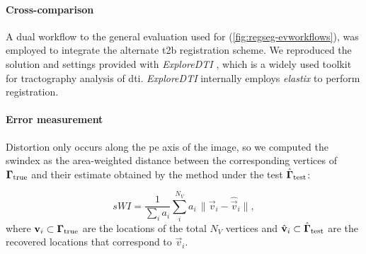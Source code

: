 \paragraph*{Cross-comparison} %
A dual workflow to the general evaluation used for \regseg{} (\autoref{fig:regseg-evworkflows}),
  was employed to integrate the alternate \gls*{t2b} registration scheme.
We reproduced the solution and settings provided with \emph{ExploreDTI}
  \citep{leemans_exploredti_2009}, which is a widely used toolkit for tractography analysis of
  \gls*{dti}.
\emph{ExploreDTI} internally employs \emph{elastix} \citep{klein_elastix_2010} to
  perform registration.

\paragraph*{Error measurement}\label{sec:regseg-experiments_evaluation}
Distortion only occurs along the \gls*{pe} axis of the image, so we computed the
  \gls*{swindex} as the area-weighted distance between the corresponding vertices of
  $\boldsymbol{\Gamma}_\text{true}$ and their estimate obtained by the method under the test $\hat{\boldsymbol{\Gamma}}_\text{test}$:

  \begin{equation}
  sWI = \frac{1}{\sum_i a_i} \sum\limits_i^{N_V} a_i\,\|
  \vec{v}_i - \hat{\vec{v}}_i \|,
  \label{eq:regseg-swindex}
  \end{equation}
  where $\mathbf{v}_i \subset \boldsymbol{\Gamma}_\text{true}$ are the locations of the total $N_V$ vertices
  and $\hat{\mathbf{v}}_i \subset \hat{\boldsymbol{\Gamma}}_\text{test}$ are the recovered locations
  that correspond to $\vec{v}_i$.
